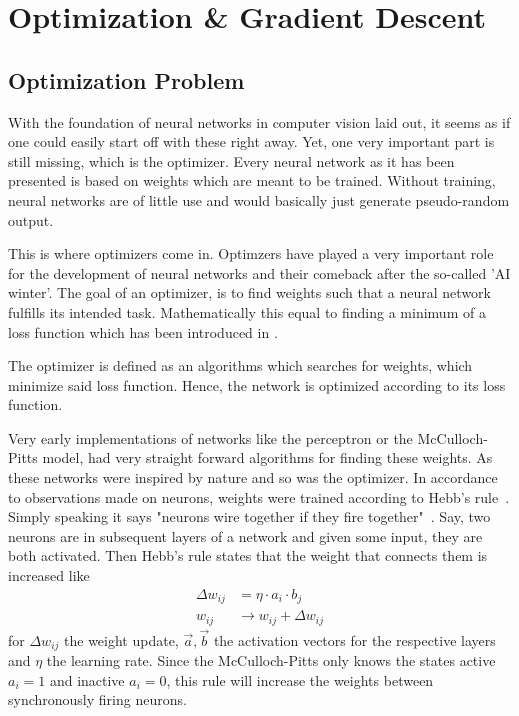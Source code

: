 \setchapterpreamble[u]{\margintoc}
\chapter{Optimization \& Gradient Descent}

\section{Optimization Problem}
With the foundation of neural networks in computer vision laid out, it seems as if one could easily start off with these right away.
Yet, one very important part is still missing, which is the optimizer.
Every neural network as it has been presented is based on weights which are meant to be trained.
Without training, neural networks are of little use and would basically just generate pseudo-random output.

This is where optimizers come in.
Optimzers have played a very important role for the development of neural networks and their comeback after the so-called 'AI winter'.
The goal of an optimizer, is to find weights such that a neural network fulfills its intended task.
Mathematically this equal to finding a minimum of a loss function which has been introduced in .

The optimizer is defined as an algorithms which searches for weights, which minimize said loss function.
Hence, the network is optimized according to its loss function.

Very early implementations of networks like the perceptron or the McCulloch-Pitts model, had very straight forward algorithms for finding these weights.
As these networks were inspired by nature and so was the optimizer.
In accordance to observations made on neurons, weights were trained according to Hebb's rule~\cite{ommer}.
Simply speaking it says "neurons wire together if they fire together"~\cite{hebb}.
Say, two neurons are in subsequent layers of a network and given some input, they are both activated.
Then Hebb's rule states that the weight that connects them is increased like
\begin{align}
    \Delta w_{ij} & = \eta \cdot a_i \cdot b_j \\
    w_{ij} & \rightarrow w_{ij} + \Delta w_{ij}
\end{align}
for $\Delta w_{ij}$ the weight update, $\vec{a}, \vec{b}$ the activation vectors for the respective layers and $\eta$ the learning rate.
Since the McCulloch-Pitts only knows the states active $a_i = 1$ and inactive $a_i = 0$, this rule will increase the weights between synchronously firing neurons.

